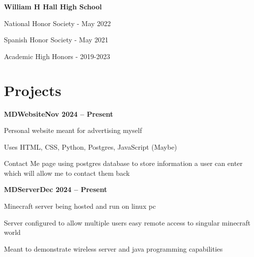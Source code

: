 \documentclass[letterpaper,10pt]{article}
\newcommand{\heading}[2]{
  \hspace{10pt}#1\hfill#2\\
}
\newcommand{\headingBf}[2]{
  \heading{\textbf{#1}}{\textbf{#2}}
}
\newenvironment{resume_list}{
  \vspace{-7pt}
  \begin{itemize}[itemsep=-2px, parsep=1pt, leftmargin=30pt]
}{
  \end{itemize}
}
\begin{document}
  \vspace{5pt}
  \headingBf{William H Hall High School}{}
  \begin{resume_list}
    \item National Honor Society \hspace{2pt}-  May 2022 
    \item Spanish Honor Society - May 2021
    \item Academic High Honors - 2019-2023
  \end{resume_list}


  \section{Projects}

  \headingBf{MDWebsite}{Nov 2024 -- Present}
  \begin{resume_list}
    \item Personal website meant for advertising myself
    \item Uses HTML, CSS, Python, Postgres, JavaScript (Maybe)
    \item Contact Me page using postgres database to store information a user can enter which will allow me to contact them back
  \end{resume_list}

  \headingBf{MDServer}{Dec 2024 -- Present}
  \begin{resume_list}
    \item Minecraft server being hosted and run on linux pc
    \item Server configured to allow multiple users easy remote access to singular minecraft world
    \item Meant to demonstrate wireless server and java programming capabilities
  \end{resume_list}
\end{document}
